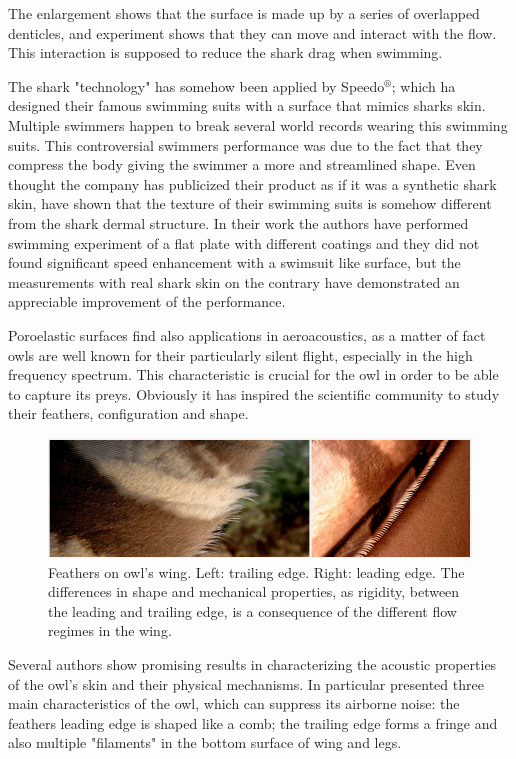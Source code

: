 The enlargement shows that the surface is made up by a series of overlapped denticles, and experiment shows that they can move and interact with the flow. This interaction is supposed to reduce the shark drag when swimming.

The shark "technology" has somehow been applied by Speedo$^{\circledR}$; which ha designed their famous swimming suits with a surface that mimics sharks skin. Multiple swimmers happen to break several world records wearing this swimming suits.
This controversial swimmers performance was due to the fact that they compress the body giving the swimmer a more and streamlined shape.
Even thought the company has publicized their product as if it was a synthetic shark skin, \citet{Oeffner785} have shown that the texture of their swimming suits is somehow different from the shark dermal structure.
In their work the authors have performed swimming experiment of a flat plate with different coatings and they did not found significant speed enhancement with a swimsuit like surface, but the measurements with real shark skin on the contrary have demonstrated an appreciable improvement of the performance.

Poroelastic surfaces find also applications in aeroacoustics, as a matter of fact owls are well known for their particularly silent flight, especially in the high frequency spectrum.
This characteristic is crucial for the owl in order to be able to capture its preys.
Obviously it has inspired the scientific community to study their feathers, configuration and shape.

\begin{figure}[h]
	\centering
	\includegraphics[width=0.8\linewidth]{chapter_1/howl}
	\caption{Feathers on owl's wing. Left: trailing edge. Right: leading edge. The differences in shape and mechanical properties, as rigidity, between the leading and trailing edge, is a consequence of the different flow regimes in the wing.}
	\label{fig:owl}
\end{figure}
 
Several authors show promising results in characterizing the acoustic properties of the owl's skin and their physical mechanisms.
In particular \citet{lilley1998} presented three main characteristics of the owl, which can suppress its airborne noise: the feathers leading edge is shaped like a comb; the trailing edge forms a fringe and also multiple "filaments" in the bottom surface of wing and legs.

